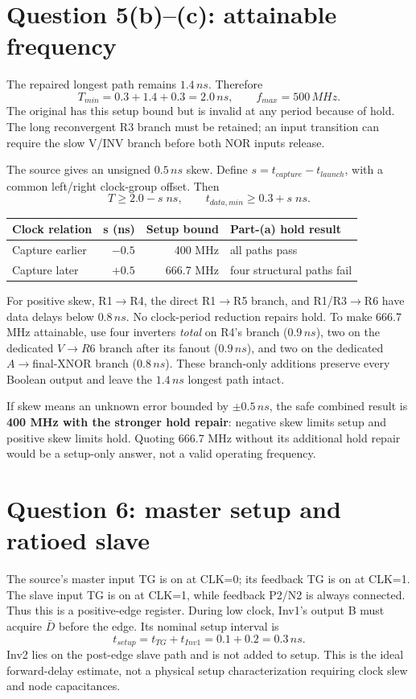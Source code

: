 \documentclass[10pt]{article}
\begin{document}
\section*{Question 5(b)--(c): attainable frequency}
The repaired longest path remains $1.4\,ns$. Therefore
\[\boxed{T_{min}=0.3+1.4+0.3=2.0\,ns,\qquad f_{max}=500\,MHz.}\]
The original has this setup bound but is invalid at any period because of hold. The long reconvergent R3 branch must be retained; an input transition can require the slow V/INV branch before both NOR inputs release.

The source gives an unsigned $0.5\,ns$ skew. Define $s=t_{capture}-t_{launch}$, with a common left/right clock-group offset. Then
\[T\ge2.0-s\;ns,\qquad t_{data,min}\ge0.3+s\;ns.\]
\begin{center}\begin{tabular}{lrrl}\toprule
Clock relation&s (ns)&Setup bound&Part-(a) hold result\\\midrule
Capture earlier&$-0.5$&400 MHz&all paths pass\\
Capture later&$+0.5$&666.7 MHz&four structural paths fail\\\bottomrule
\end{tabular}\end{center}
For positive skew, R1$\to$R4, the direct R1$\to$R5 branch, and R1/R3$\to$R6 have data delays below $0.8\,ns$. No clock-period reduction repairs hold. To make 666.7 MHz attainable, use four inverters \emph{total} on R4's branch ($0.9\,ns$), two on the dedicated $V\to R6$ branch after its fanout ($0.9\,ns$), and two on the dedicated $A\to$final-XNOR branch ($0.8\,ns$). These branch-only additions preserve every Boolean output and leave the $1.4\,ns$ longest path intact.

If skew means an unknown error bounded by $\pm0.5\,ns$, the safe combined result is \textbf{400 MHz with the stronger hold repair}: negative skew limits setup and positive skew limits hold. Quoting 666.7 MHz without its additional hold repair would be a setup-only answer, not a valid operating frequency.
\section*{Question 6: master setup and ratioed slave}
The source's master input TG is on at CLK=0; its feedback TG is on at CLK=1. The slave input TG is on at CLK=1, while feedback P2/N2 is always connected. Thus this is a positive-edge register. During low clock, Inv1's output B must acquire $\bar D$ before the edge. Its nominal setup interval is
\[\boxed{t_{setup}=t_{TG}+t_{Inv1}=0.1+0.2=0.3\,ns.}\]
Inv2 lies on the post-edge slave path and is not added to setup. This is the ideal forward-delay estimate, not a physical setup characterization requiring clock slew and node capacitances.
\end{document}
